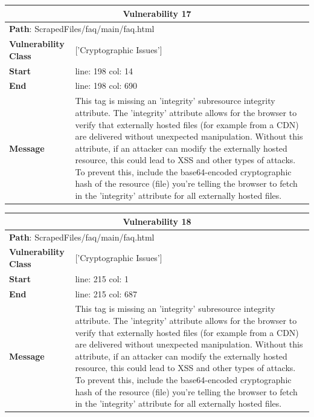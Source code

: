 \documentclass[12pt]{article}
\begin{document}
\vspace{0.7cm}
\FloatBarrier
\begin{table}[!h]
\centering
\renewcommand{\arraystretch}{1.3}
\begin{tabular}{|l|p{10cm}|}
\hline
\multicolumn{2}{|c|}{\textbf{Vulnerability 17}} \\
\hline
\multicolumn{2}{|l|}{\textbf{Path}: ScrapedFiles/faq/main/faq.html} \\
\hline
\textbf{Vulnerability Class} & ['Cryptographic Issues'] \\
\hline
\textbf{Start} & line: 198 \quad col: 14 \\
\hline
\textbf{End} & line: 198 \quad col: 690 \\
\hline
\textbf{Message} & This tag is missing an 'integrity' subresource integrity attribute. The 'integrity' attribute allows for the browser to verify that externally hosted files (for example from a CDN) are delivered without unexpected manipulation. Without this attribute, if an attacker can modify the externally hosted resource, this could lead to XSS and other types of attacks. To prevent this, include the base64-encoded cryptographic hash of the resource (file) you're telling the browser to fetch in the 'integrity' attribute for all externally hosted files. \\
\hline
\end{tabular}
\end{table}
\vspace{0.7cm}
\FloatBarrier
\begin{table}[!h]
\centering
\renewcommand{\arraystretch}{1.3}
\begin{tabular}{|l|p{10cm}|}
\hline
\multicolumn{2}{|c|}{\textbf{Vulnerability 18}} \\
\hline
\multicolumn{2}{|l|}{\textbf{Path}: ScrapedFiles/faq/main/faq.html} \\
\hline
\textbf{Vulnerability Class} & ['Cryptographic Issues'] \\
\hline
\textbf{Start} & line: 215 \quad col: 1 \\
\hline
\textbf{End} & line: 215 \quad col: 687 \\
\hline
\textbf{Message} & This tag is missing an 'integrity' subresource integrity attribute. The 'integrity' attribute allows for the browser to verify that externally hosted files (for example from a CDN) are delivered without unexpected manipulation. Without this attribute, if an attacker can modify the externally hosted resource, this could lead to XSS and other types of attacks. To prevent this, include the base64-encoded cryptographic hash of the resource (file) you're telling the browser to fetch in the 'integrity' attribute for all externally hosted files. \\
\hline
\end{tabular}
\end{table}
\end{document}
